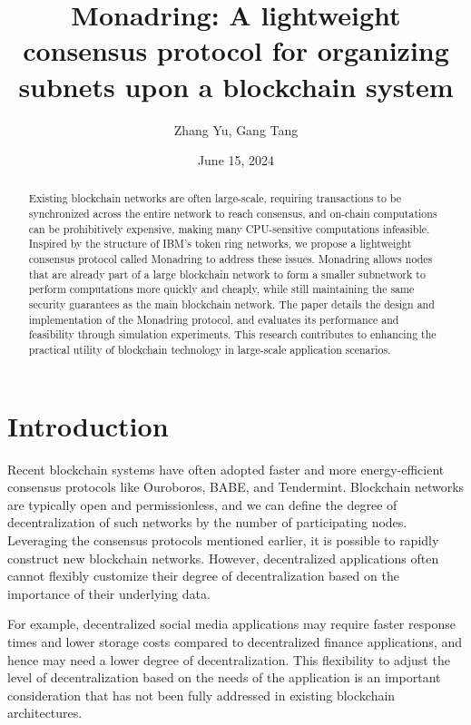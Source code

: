 \documentclass[11pt]{article}
\begin{document}
\title{Monadring: A lightweight consensus protocol for organizing subnets upon a blockchain system}
\author{Zhang Yu, Gang Tang}
\date{June 15, 2024}
\maketitle

\begin{abstract}
Existing blockchain networks are often large-scale, requiring transactions to be synchronized across the entire network to reach consensus, and on-chain computations can be prohibitively expensive, making many CPU-sensitive computations infeasible.
Inspired by the structure of IBM's token ring networks, we propose a lightweight consensus protocol called Monadring to address these issues.
Monadring allows nodes that are already part of a large blockchain network to form a smaller subnetwork to perform computations more quickly and cheaply, while still maintaining the same security guarantees as the main blockchain network.
The paper details the design and implementation of the Monadring protocol, and evaluates its performance and feasibility through simulation experiments.
This research contributes to enhancing the practical utility of blockchain technology in large-scale application scenarios.
\end{abstract}

\section{Introduction}
Recent blockchain systems have often adopted faster and more energy-efficient consensus protocols like Ouroboros, BABE, and Tendermint.
Blockchain networks are typically open and permissionless, and we can define the degree of decentralization of such networks by the number of participating nodes.
Leveraging the consensus protocols mentioned earlier, it is possible to rapidly construct new blockchain networks.
However, decentralized applications often cannot flexibly customize their degree of decentralization based on the importance of their underlying data.

For example, decentralized social media applications may require faster response times and lower storage costs compared to decentralized finance applications, and hence may need a lower degree of decentralization.
This flexibility to adjust the level of decentralization based on the needs of the application is an important consideration that has not been fully addressed in existing blockchain architectures.
\end{document}
